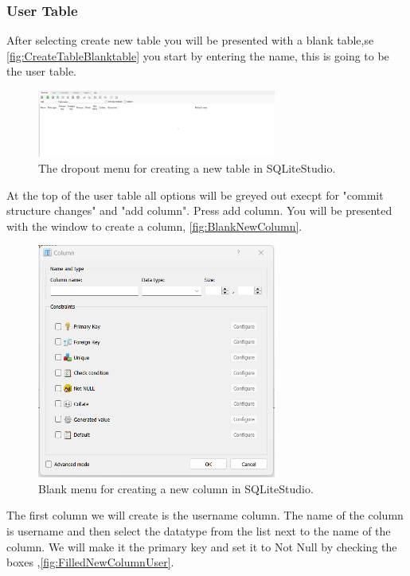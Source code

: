 \documentclass[a4paper,11pt,oneside]{article}
\begin{document}
\begin{sloppypar}
\subsubsection{User Table}
\label{sqliteStudioUserTable}
After selecting create new table you will be presented with a blank table,se \autoref{fig:CreateTableBlanktable} you start by entering the name, this is going to be the user table.
\begin{figure}[!htb]
  \centering
  \includegraphics[width=0.7\textwidth]{sqlitestudio/create_table/create_table_blank.png}
  \caption{The dropout menu for creating a new table in SQLiteStudio.}
  \label{fig:CreateTableBlanktable}
\end{figure}
At the top of the user table all options will be greyed out execpt for "commit structure changes" and "add column". Press add column. You will be presented with the window to create a column, \autoref{fig:BlankNewColumn}. 
\begin{figure}[!htb]
  \centering
  \includegraphics[width=0.7\textwidth]{sqlitestudio/create_table/create_table_column_blank.png}
  \caption{Blank menu for creating a new column in SQLiteStudio.}
  \label{fig:BlankNewColumn}
\end{figure}
The first column we will create is the username column. The name of the column is username and then select the datatype from the list next to the name of the column. We will make it the primary key and set it to Not Null by checking the boxes ,\autoref{fig:FilledNewColumnUser}. 

\end{sloppypar}
\end{document}
